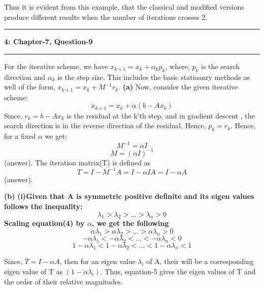\documentclass{article}
\newcommand\question[2]{\vspace{.25in}\hrule\textbf{#1: #2}\hrule\vspace{.10in}}
\renewcommand\part[1]{\vspace{.10in}\textbf{(#1)}}
\begin{document}
  Thus it is evident from this example, that the classical and modified versions produce different results when the number of iterations crosses 2. \newline

 \question{4}{Chapter-7, Question-9}
 For the iterative scheme, we have $x_{k+1} = x_{k} + \alpha_{k}p_{k}$, where, $p_{k}$ is the search direction and $\alpha_{k}$ is the step size. This includes the basic statioanry methods as well of the form, $x_{k+1} = x_{k} + M^{-1}r_{k}$.\newline
 \part{a}
 Now, consider the given iterative scheme: \newline
 \[ x_{k+1} = x_{k} + \alpha(b - Ax_{k}) \]
 Since, $r_{k} = b - Ax_{k}$ is the residual at the k'th step, and in gradient descent , the search direction is in the reverse direction of the residual, Hence, $p_{k} = r_{k}$. Hence, for a fixed $\alpha$ we get: 
 \[M^{-1} = \alpha I\]
 \[M = (\alpha I)^{-1}\]
 (answer). \newline
 The iteration matrix(T) is defined as \newline
 \[T = I - M^{-1}A = I - \alpha I A = I - \alpha A\]
 (answer). \newline

  \part{b}
  \bf {(i)}Given that A is symmetric positive definite and its eigen values follows the inequality: \newline
  \begin{equation}
	  \lambda_1 > \lambda_2 > \dots > \lambda_n > 0
  \end{equation}
  Scaling equation(4) by $\alpha$, we get the following
	\[  \alpha\lambda_1 > \alpha\lambda_2 > \dots > \alpha\lambda_n > 0 \]
	\[  -\alpha\lambda_1 < -\alpha\lambda_2 < \dots < -\alpha\lambda_n < 0 \]
 \begin{equation}
	 1 -\alpha\lambda_1 < 1 -\alpha\lambda_2 < \dots < 1 -\alpha\lambda_n < 1 
 \end{equation}

 Since, $T = I - \alpha A$, then for an eigen value $\lambda_i$ of A, their will be a corresponding eigen value of T as $(1 - \alpha \lambda_i)$. Thus, equation-5 gives the eigen values of T and the order of their relative magnitudes. \newline
\end{document}
